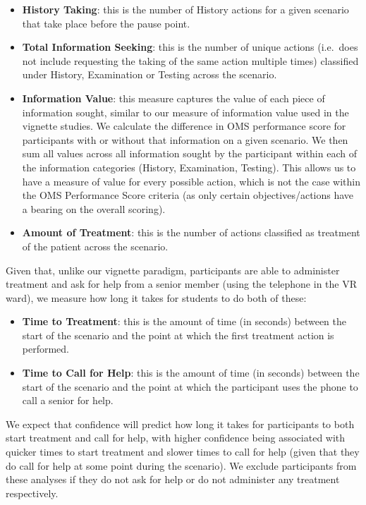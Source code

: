 \documentclass[a4paper, nobind]{templates/ociamthesis}
\providecommand{\tightlist}{%
  \setlength{\itemsep}{0pt}\setlength{\parskip}{0pt}}
\begin{document}
\begin{itemize}
\tightlist
\item
  \textbf{History Taking}: this is the number of History actions for a given scenario that take place before the pause point.
\item
  \textbf{Total Information Seeking}: this is the number of unique actions (i.e.~does not include requesting the taking of the same action multiple times) classified under History, Examination or Testing across the scenario.
\item
  \textbf{Information Value}: this measure captures the value of each piece of information sought, similar to our measure of information value used in the vignette studies. We calculate the difference in OMS performance score for participants with or without that information on a given scenario. We then sum all values across all information sought by the participant within each of the information categories (History, Examination, Testing). This allows us to have a measure of value for every possible action, which is not the case within the OMS Performance Score criteria (as only certain objectives/actions have a bearing on the overall scoring).
\item
  \textbf{Amount of Treatment}: this is the number of actions classified as treatment of the patient across the scenario.
\end{itemize}

\hfill\break
Given that, unlike our vignette paradigm, participants are able to administer treatment and ask for help from a senior member (using the telephone in the VR ward), we measure how long it takes for students to do both of these:

\begin{itemize}
\item
  \textbf{Time to Treatment}: this is the amount of time (in seconds) between the start of the scenario and the point at which the first treatment action is performed.
\item
  \textbf{Time to Call for Help}: this is the amount of time (in seconds) between the start of the scenario and the point at which the participant uses the phone to call a senior for help.
\end{itemize}

We expect that confidence will predict how long it takes for participants to both start treatment and call for help, with higher confidence being associated with quicker times to start treatment and slower times to call for help (given that they do call for help at some point during the scenario). We exclude participants from these analyses if they do not ask for help or do not administer any treatment respectively.
\end{document}
